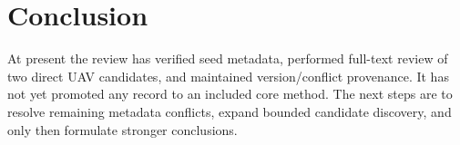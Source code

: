 \section{Conclusion}

At present the review has verified seed metadata, performed full-text review of
two direct UAV candidates, and maintained version/conflict provenance. It has
not yet promoted any record to an included core method. The next steps are to
resolve remaining metadata conflicts, expand bounded candidate discovery, and
only then formulate stronger conclusions.
